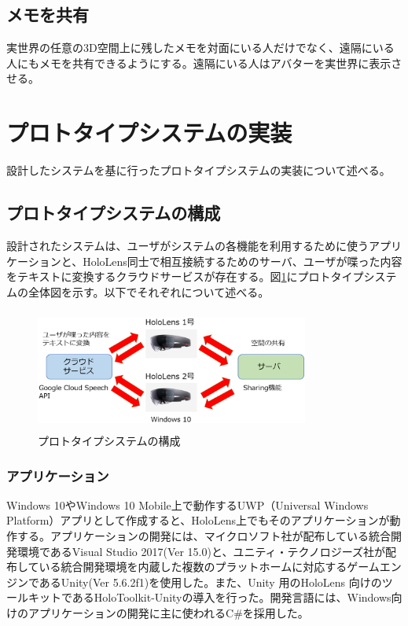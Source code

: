 \documentclass[technicalreport]{ieicej}
\begin{document}
\subsection{メモを共有}
実世界の任意の3D空間上に残したメモを対面にいる人だけでなく、遠隔にいる人にもメモを共有できるようにする。遠隔にいる人はアバターを実世界に表示させる。

\section{プロトタイプシステムの実装}
設計したシステムを基に行ったプロトタイプシステムの実装について述べる。

\subsection{プロトタイプシステムの構成}
設計されたシステムは、ユーザがシステムの各機能を利用するために使うアプリケーションと、HoloLens同士で相互接続するためのサーバ、ユーザが喋った内容をテキストに変換するクラウドサービスが存在する。図\ref{fig:prototypesystem1}にプロトタイプシステムの全体図を示す。以下でそれぞれについて述べる。

\begin{figure}[h]
  \begin{center}
    \includegraphics[clip,height=4.0cm,width=9.0cm]{./prototypesystem1.eps}
    \caption{プロトタイプシステムの構成}
    \label{fig:prototypesystem1}
  \end{center}
\end{figure}

\subsubsection{アプリケーション}
Windows 10やWindows 10 Mobile上で動作するUWP（Universal Windows Platform）アプリとして作成すると、HoloLens上でもそのアプリケーションが動作する。アプリケーションの開発には、マイクロソフト社が配布している統合開発環境であるVisual Studio 2017(Ver 15.0)と、ユニティ・テクノロジーズ社が配布している統合開発環境を内蔵した複数のプラットホームに対応するゲームエンジンであるUnity(Ver 5.6.2f1)を使用した。また、Unity 用のHoloLens 向けのツールキットであるHoloToolkit-Unityの導入を行った。開発言語には、Windows向けのアプリケーションの開発に主に使われるC\#を採用した。
\end{document}
